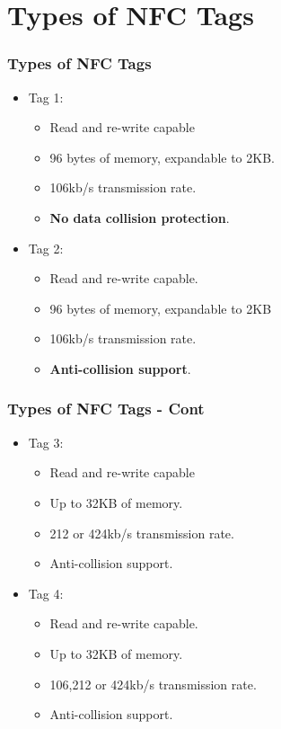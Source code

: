 \documentclass{beamer}
\begin{document}
\section{Types of NFC Tags}
\begin{frame}
\frametitle{Types of NFC Tags}
\begin{itemize}
\item Tag 1:
\begin{itemize}
\item Read and re-write capable
\item 96 bytes of memory, expandable to 2KB.
\item 106kb/s transmission rate.
\item \textbf{No data collision protection}.
\end{itemize}
\item Tag 2:
\begin{itemize}
\item Read and re-write capable.
\item 96 bytes of memory, expandable to 2KB
\item 106kb/s transmission rate.
\item \textbf{Anti-collision support}. 
\end{itemize}
\end{itemize}
\end{frame}
\begin{frame}
\frametitle{Types of NFC Tags - Cont}
\begin{itemize}
\item Tag 3:
\begin{itemize}
\item Read and re-write capable
\item Up to 32KB of memory.
\item 212 or 424kb/s transmission rate.
\item Anti-collision support.
\end{itemize}
\item Tag 4:
\begin{itemize}
\item Read and re-write capable.
\item Up to 32KB of memory.
\item 106,212 or 424kb/s transmission rate.
\item Anti-collision support.
\end{itemize}
\end{itemize}
\end{frame}
\end{document}
